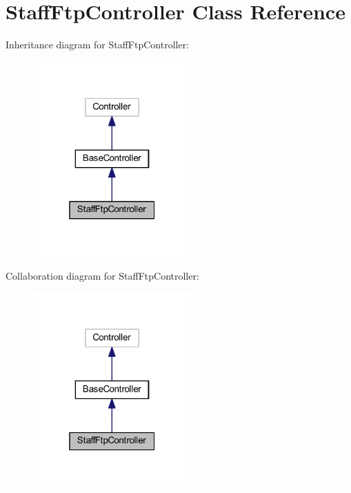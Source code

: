 \hypertarget{class_staff_ftp_controller}{}\section{Staff\+Ftp\+Controller Class Reference}
\label{class_staff_ftp_controller}


Inheritance diagram for Staff\+Ftp\+Controller\+:
\nopagebreak
\begin{figure}[H]
\begin{center}
\leavevmode
\includegraphics[width=172pt]{class_staff_ftp_controller__inherit__graph}
\end{center}
\end{figure}


Collaboration diagram for Staff\+Ftp\+Controller\+:
\nopagebreak
\begin{figure}[H]
\begin{center}
\leavevmode
\includegraphics[width=172pt]{class_staff_ftp_controller__coll__graph}
\end{center}
\end{figure}
